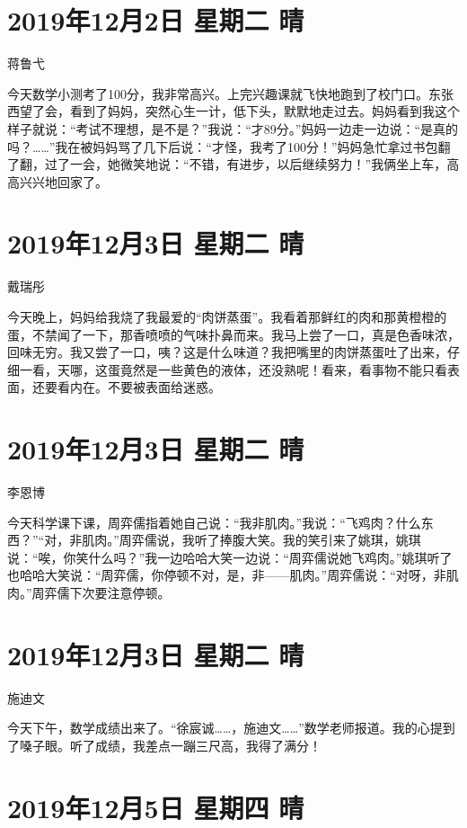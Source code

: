 \section{2019年12月2日 星期二 晴}

蒋鲁弋

今天数学小测考了100分，我非常高兴。上完兴趣课就飞快地跑到了校门口。东张西望了会，看到了妈妈，突然心生一计，低下头，默默地走过去。妈妈看到我这个样子就说：``考试不理想，是不是？''我说：``才89分。''妈妈一边走一边说：``是真的吗？\ldots\ldots{}''我在被妈妈骂了几下后说：``才怪，我考了100分！''妈妈急忙拿过书包翻了翻，过了一会，她微笑地说：``不错，有进步，以后继续努力！''我俩坐上车，高高兴兴地回家了。

\section{2019年12月3日 星期二 晴}

戴瑞彤

今天晚上，妈妈给我烧了我最爱的``肉饼蒸蛋''。我看着那鲜红的肉和那黄橙橙的蛋，不禁闻了一下，那香喷喷的气味扑鼻而来。我马上尝了一口，真是色香味浓，回味无穷。我又尝了一口，咦？这是什么味道？我把嘴里的肉饼蒸蛋吐了出来，仔细一看，天哪，这蛋竟然是一些黄色的液体，还没熟呢！看来，看事物不能只看表面，还要看内在。不要被表面给迷惑。

\section{2019年12月3日 星期二 晴}

李恩博

今天科学课下课，周弈儒指着她自己说：``我非肌肉。''我说：``飞鸡肉？什么东西？''``对，非肌肉。''周弈儒说，我听了捧腹大笑。我的笑引来了姚琪，姚琪说：``唉，你笑什么吗？''我一边哈哈大笑一边说：``周弈儒说她飞鸡肉。''姚琪听了也哈哈大笑说：``周弈儒，你停顿不对，是，非------肌肉。''周弈儒说：``对呀，非肌肉。''周弈儒下次要注意停顿。

\section{2019年12月3日 星期二 晴}

施迪文

今天下午，数学成绩出来了。``徐宸诚\ldots\ldots，施迪文\ldots\ldots{}''数学老师报道。我的心提到了嗓子眼。听了成绩，我差点一蹦三尺高，我得了满分！

\section{2019年12月5日 星期四 晴}

